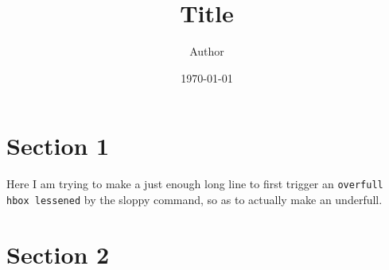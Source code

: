 \documentclass[10pt]{article}
\title{Title}
\author{Author}
\date{\today}
\begin{document}
\maketitle

\section{Section 1}
\label{sec:section-1}

\sloppy

Here I am trying to make a just enough long line to first trigger an
\verb+overfull hbox lessened+ by the sloppy command, so as to actually
make an underfull.

\section{Section 2}
\label{sec:section-2}
\end{document}
